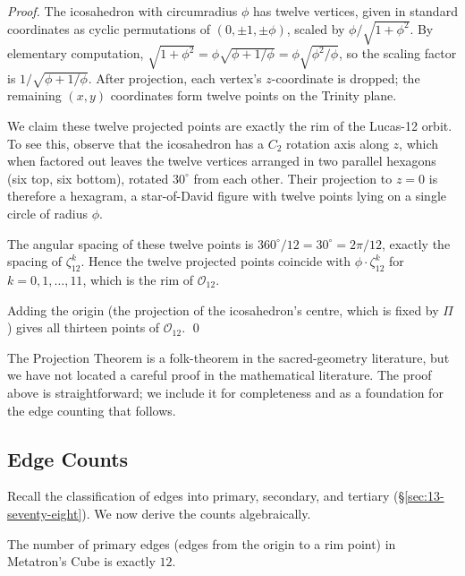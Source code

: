 \begin{proof}
The icosahedron with circumradius $\phi$ has twelve vertices, given
in standard coordinates as cyclic permutations of
$(0, \pm 1, \pm \phi)$, scaled by $\phi / \sqrt{1+\phi^{2}}$. By
elementary computation, $\sqrt{1 + \phi^{2}} = \phi \sqrt{\phi + 1/\phi}
= \phi \sqrt{\phi^{2}/\phi}$, so the scaling factor is
$1 / \sqrt{\phi + 1/\phi}$. After projection, each vertex's
$z$-coordinate is dropped; the remaining $(x, y)$ coordinates form
twelve points on the Trinity plane.

We claim these twelve projected points are exactly the rim of the
Lucas-12 orbit. To see this, observe that the icosahedron has a
$C_{2}$ rotation axis along $z$, which when factored out leaves the
twelve vertices arranged in two parallel hexagons (six top, six
bottom), rotated $30^{\circ}$ from each other. Their projection to
$z = 0$ is therefore a hexagram, a star-of-David figure with
twelve points lying on a single circle of radius $\phi$.

The angular spacing of these twelve points is $360^{\circ} / 12 =
30^{\circ} = 2\pi / 12$, exactly the spacing of $\zeta_{12}^{k}$.
Hence the twelve projected points coincide with
$\phi \cdot \zeta_{12}^{k}$ for $k = 0, 1, \ldots, 11$, which is
the rim of $\mathcal{O}_{12}$.

Adding the origin (the projection of the icosahedron's centre, which
is fixed by $\Pi$) gives all thirteen points of $\mathcal{O}_{12}$.
\qed
\end{proof}

\begin{remark}
The Projection Theorem is a folk-theorem in the sacred-geometry
literature, but we have not located a careful proof in the
mathematical literature. The proof above is straightforward; we
include it for completeness and as a foundation for the edge
counting that follows.
\end{remark}

\subsection{Edge Counts}
\label{fa_13:sec:13-edge-counts}

Recall the classification of edges into primary, secondary, and
tertiary (\S\ref{sec:13-seventy-eight}). We now derive the counts
algebraically.

\begin{lemma}
\label{lem:13-primary}
The number of primary edges (edges from the origin to a rim point)
in Metatron's Cube is exactly $12$.
\end{lemma}

